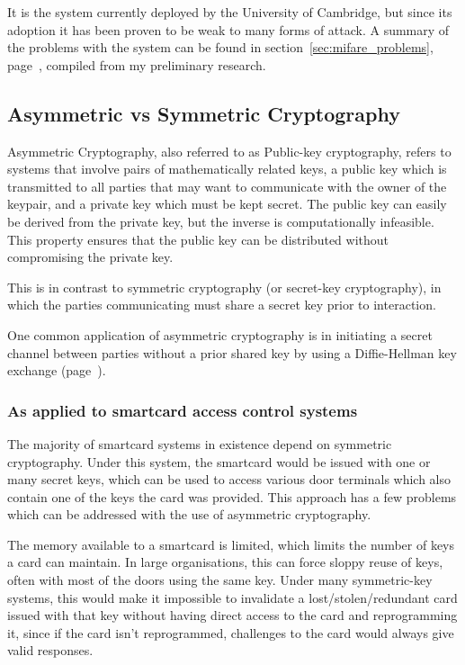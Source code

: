 \documentclass[12pt]{article}
\begin{document}
It is the system currently deployed by the University of Cambridge, but since its adoption it has been proven to be weak to many forms of attack. A summary of the problems with the system can be found in section~\ref{sec:mifare_problems}, page~\pageref{sec:mifare_problems}, compiled from my preliminary research.



\subsection{Asymmetric vs Symmetric Cryptography}
Asymmetric Cryptography, also referred to as Public-key cryptography, refers to systems that involve pairs of mathematically related keys, a public key which is transmitted to all parties that may want to communicate with the owner of the keypair, and a private key which must be kept secret. The public key can easily be derived from the private key, but the inverse is computationally infeasible. This property ensures that the public key can be distributed without compromising the private key.

This is in contrast to symmetric cryptography (or secret-key cryptography), in which the parties communicating must share a secret key prior to interaction.

One common application of asymmetric cryptography is in initiating a secret channel between parties without a prior shared key by using a Diffie-Hellman key exchange (page~\pageref{subsec:diffie_hellman}).

\subsubsection{As applied to smartcard access control systems}
\label{subsec:asymmetric_smartcards}

The majority of smartcard systems in existence depend on symmetric cryptography. Under this system, the smartcard would be issued with one or many secret keys, which can be used to access various door terminals which also contain one of the keys the card was provided. This approach has a few problems which can be addressed with the use of asymmetric cryptography.

The memory available to a smartcard is limited, which limits the number of keys a card can maintain. In large organisations, this can force sloppy reuse of keys, often with most of the doors using the same key. Under many symmetric-key systems, this would make it impossible to invalidate a lost/stolen/redundant card issued with that key without having direct access to the card and reprogramming it, since if the card isn’t reprogrammed, challenges to the card would always give valid responses. 
\end{document}
